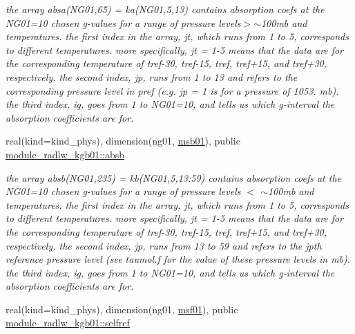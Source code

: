 \begin{DoxyCompactItemize}
\begin{DoxyCompactList}\small\item\em the array absa(\+N\+G01,65) = ka(\+N\+G01,5,13) contains absorption coefs at the N\+G01=10 chosen g-\/values for a range of pressure levels$>$$\sim$100mb and temperatures. the first index in the array, jt, which runs from 1 to 5, corresponds to different temperatures. more specifically, jt = 1-\/5 means that the data are for the corresponding temperature of tref-\/30, tref-\/15, tref, tref+15, and tref+30, respectively. the second index, jp, runs from 1 to 13 and refers to the corresponding pressure level in pref (e.\+g. jp = 1 is for a pressure of 1053. mb). the third index, ig, goes from 1 to N\+G01=10, and tells us which g-\/interval the absorption coefficients are for. \end{DoxyCompactList}\item 
\mbox{\label{group__module__radlw__kgbnn_gabdaefe1c38d8bfcac5ef9b878fac77cb}} 
real(kind=kind\+\_\+phys), dimension(ng01, \hyperlink{group__module__radlw__kgbnn_gae34d953adc793ad27a294864e3e0e354}{msb01}), public \hyperlink{group__module__radlw__kgbnn_gabdaefe1c38d8bfcac5ef9b878fac77cb}{module\+\_\+radlw\+\_\+kgb01\+::absb}
\begin{DoxyCompactList}\small\item\em the array absb(\+N\+G01,235) = kb(\+N\+G01,5,13\+:59) contains absorption coefs at the N\+G01=10 chosen g-\/values for a range of pressure levels $<$ $\sim$100mb and temperatures. the first index in the array, jt, which runs from 1 to 5, corresponds to different temperatures. more specifically, jt = 1-\/5 means that the data are for the corresponding temperature of tref-\/30, tref-\/15, tref, tref+15, and tref+30, respectively. the second index, jp, runs from 13 to 59 and refers to the jpth reference pressure level (see taumol.\+f for the value of these pressure levels in mb). the third index, ig, goes from 1 to N\+G01=10, and tells us which g-\/interval the absorption coefficients are for. \end{DoxyCompactList}\item 
\mbox{\label{group__module__radlw__kgbnn_ga14c7cc68b26c0ab1fdfda6faa2d485d5}} 
real(kind=kind\+\_\+phys), dimension(ng01, \hyperlink{group__module__radlw__kgbnn_ga321c2e84e14d28142d08bb5fbe485a67}{msf01}), public \hyperlink{group__module__radlw__kgbnn_ga14c7cc68b26c0ab1fdfda6faa2d485d5}{module\+\_\+radlw\+\_\+kgb01\+::selfref}

\end{DoxyCompactItemize}
